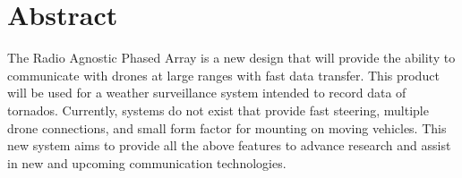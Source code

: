 \documentclass[UROP.tex]{subfiles}
\begin{document}
\bigskip
\section*{\Large Abstract}
	The Radio Agnostic Phased Array is a new design that will provide the ability to communicate with drones at large ranges with fast data transfer.  This product will be used for a weather surveillance system intended to record data of tornados.  Currently, systems do not exist that provide fast steering, multiple drone connections, and small form factor for mounting on moving vehicles.  This new system aims to provide all the above features to advance research and assist in new and upcoming communication technologies.
\end{document}
